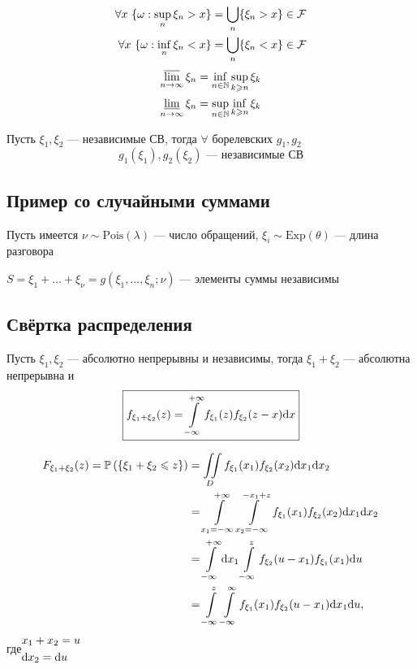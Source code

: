 \documentclass[a4paper, 10pt]{article}
\begin{document}
\begin{equation*}
    \begin{aligned}
        \forall x\ \{\omega:\sup_n\xi_n>x\}&=\bigcup_n\{\xi_n>x\}\in\fk\\
        \forall x\ \{\omega:\inf_n\xi_n<x\}&=\bigcup_n\{\xi_n<x\}\in\fk
    \end{aligned}
\end{equation*}
\begin{equation*}
    \begin{aligned}
        \varlimsup_{n\to\infty}\xi_n&=\inf_{n\in\mathbb{N}}\sup_{k\geqslant n}\xi_k\\
        \varliminf_{n\to\infty}\xi_n&=\sup_{n\in\mathbb{N}}\inf_{k\geqslant n}\xi_k
    \end{aligned}
\end{equation*}

\theorem Пусть $\xi_1,\xi_2$ — независимые СВ, тогда $\forall$ борелевских $g_1,g_2$
\begin{equation*}
    g_1(\xi_1),g_2(\xi_2)\text{ — независимые СВ}
\end{equation*}

\subsection{Пример со случайными суммами}
Пусть имеется $\nu\sim\text{Pois}(\lambda)$ — число обращений, $\xi_i\sim\text{Exp}(\theta)$ — длина разговора

$S=\xi_1+\ldots+\xi_\nu=g(\xi_1,\ldots,\xi_n;\nu)$ — элементы суммы независимы


\subsection{Свёртка распределения}
 Пусть $\xi_1,\xi_2$ — абсолютно непрерывны и независимы, тогда $\xi_1+\xi_2$ — абсолютна непрерывна и 
\begin{equation*}
    \boxed{f_{\xi_1+\xi_2}(z)=\int\limits_{-\infty}^{+\infty}f_{\xi_1}(z)f_{\xi_2}(z-x)\text{d}x}
\end{equation*}

\begin{equation*}
    \begin{aligned}
        F_{\xi_1+\xi_2}(z)=\mathbb{P}\left(\{\xi_1+\xi_2\leqslant z\}\right)&=\iint\limits_{D}f_{\xi_1}(x_1)f_{\xi_2}(x_2)\text{d}x_1\text{d}x_2\\
        &=\int\limits_{x_1=-\infty}^{+\infty}\int\limits_{x_2=-\infty}^{-x_1+z}f_{\xi_1}(x_1)f_{\xi_2}(x_2)\text{d}x_1\text{d}x_2\\
        &=\int\limits_{-\infty}^{+\infty}\text{d}x_1\int\limits_{-\infty}^{z}f_{\xi_2}(u-x_1)f_{\xi_1}(x_1)\text{d}u\\
        &=\int\limits_{-\infty}^{z}\int\limits_{-\infty}^{\infty}f_{\xi_1}(x_1)f_{\xi_2}(u-x_1)\text{d}x_1\text{d}u,
    \end{aligned}
\end{equation*}
где\quad $\begin{aligned}
    &x_1+x_2=u\\
    &\text{d}x_2=\text{d}u
\end{aligned}$
\end{document}
